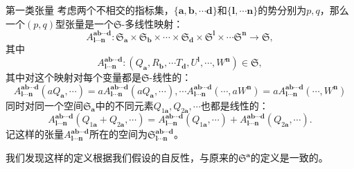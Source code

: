 \begin{defi}[label={defi:tensor of first type}]{第一类张量}
	考虑两个不相交的指标集，$\{\boldsymbol{a} ,\boldsymbol{b} ,\cdots \boldsymbol{d}\}$和$\{\boldsymbol{l} ,\cdots \boldsymbol{n}\}$的势分别为$p,q$，那么一个$( p,q)$型张量是一个$\mathfrak{S}$-多线性映射：
	\begin{equation*}
		A_{\boldsymbol{l} \cdots \boldsymbol{n}}^{\boldsymbol{ab} \cdots \boldsymbol{d}} :\mathfrak{S}_{\boldsymbol{a}} \times \mathfrak{S}_{\boldsymbol{b}} \times \cdots \times \mathfrak{S}_{\boldsymbol{d}} \times \mathfrak{S}^{\boldsymbol{l}} \times \cdots \mathfrak{S}^{\boldsymbol{n}}\rightarrow \mathfrak{S} ,
	\end{equation*}
	其中
	\begin{equation*}
		A_{\boldsymbol{l} \cdots \boldsymbol{n}}^{\boldsymbol{ab} \cdots \boldsymbol{d}} :(Q_{\boldsymbol{a}} ,R_{\boldsymbol{b}} ,\cdots T_{\boldsymbol{d}} ,U^{\boldsymbol{l}} ,\cdots ,W^{\boldsymbol{n}} )\in \mathfrak{S} ,
	\end{equation*}
	其中对这个映射对每个变量都是$\mathfrak{S}$-线性的：
	\begin{equation*}
		A_{\boldsymbol{l} \cdots \boldsymbol{n}}^{\boldsymbol{ab} \cdots \boldsymbol{d}} (aQ_{\boldsymbol{a}} ,\cdots )=aA_{\boldsymbol{l} \cdots \boldsymbol{n}}^{\boldsymbol{ab} \cdots \boldsymbol{d}} (aQ_{\boldsymbol{a}} ,\cdots ),\cdots A_{\boldsymbol{l} \cdots \boldsymbol{n}}^{\boldsymbol{ab} \cdots \boldsymbol{d}} (\cdots ,aW^{\boldsymbol{n}} )=aA_{\boldsymbol{l} \cdots \boldsymbol{n}}^{\boldsymbol{ab} \cdots \boldsymbol{d}} (\cdots ,W^{\boldsymbol{n}} )
	\end{equation*}
	同时对同一个空间$\mathfrak{S}_{\boldsymbol{a}}$中的不同元素$Q_{1\boldsymbol{a}} ,Q_{2\boldsymbol{a}} ,\cdots $也都是线性的：
	\begin{equation*}
		A_{\boldsymbol{l} \cdots \boldsymbol{n}}^{\boldsymbol{ab} \cdots \boldsymbol{d}} (Q_{1\boldsymbol{a}} +Q_{2\boldsymbol{a}} ,\cdots )=A_{\boldsymbol{l} \cdots \boldsymbol{n}}^{\boldsymbol{ab} \cdots \boldsymbol{d}} (Q_{1\boldsymbol{a}} ,\cdots )+A_{\boldsymbol{l} \cdots \boldsymbol{n}}^{\boldsymbol{ab} \cdots \boldsymbol{d}} (Q_{2\boldsymbol{a}} ,\cdots ).
	\end{equation*}
	记这样的张量$A_{\boldsymbol{l} \cdots \boldsymbol{n}}^{\boldsymbol{ab} \cdots \boldsymbol{d}}$所在的空间为$\mathfrak{S}_{\boldsymbol{l} \cdots \boldsymbol{n}}^{\boldsymbol{ab} \cdots \boldsymbol{d}}$。
\end{defi}

我们发现这样的定义根据我们假设的自反性，与原来的$\mathfrak{S}^{\boldsymbol{a}}$的定义是一致的。

